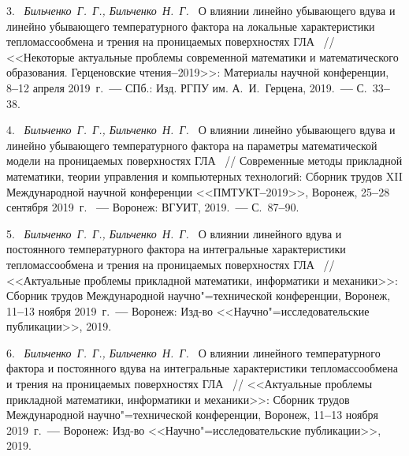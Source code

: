 3.~%
\textit%
{Бильченко~Г.~Г.,
 Бильченко~Н.~Г.~}
{%
  {О  влиянии
линейно  убывающего
вдува  и
линейно  убывающего
температурного  фактора
на  локальные  характеристики
тепломассообмена  и 	трения
на  проницаемых  поверхностях  ГЛА}%
~/$\!$/
  <<Некоторые  актуальные  проблемы
  современной  математики
  и  математического  образования.
    Герценовские  чтения{\textbf{--}}2019>>:
  Материалы  научной  конференции,
  8{\textbf{--}}12
  апреля  2019~г.~{\textbf{---}}
  СПб.:  Изд.  \mbox{РГПУ}  им.  А.~И.~Герцена,
  2019.~{\textbf{---}}
  С.~33{\textbf{--}}38.%
  }



4.~%
\textit%
{Бильченко~Г.~Г.,
 Бильченко~Н.~Г.~}
{%
  {О  влиянии
линейно  убывающего
вдува  и
линейно  убывающего
температурного  фактора
на  параметры  математической  модели
на  проницаемых  поверхностях  ГЛА}%
~/$\!$/
  Современные  методы  прикладной  математики,
  теории  управления  и  компьютерных  технологий:
  Сборник  трудов
  XII  Международной  научной
  конференции
  <<\mbox{ПМТУКТ}{\textbf{--}}2019>>,
  Воронеж,
  25{\textbf{--}}28
  сентября  2019~г.%
~{\textbf{---}}
  Воронеж:  ВГУИТ,
  2019.~{\textbf{---}}
  С.~87{\textbf{--}}90.%
  }



5.~%
\textit%
{Бильченко~Г.~Г.,
 Бильченко~Н.~Г.~}
{%
  {О  влиянии  линейного  вдува
и  постоянного  температурного  фактора
на  интегральные  характеристики  тепломассообмена
и  трения
на  проницаемых  поверхностях
ГЛА}%
~/$\!$/
  <<Актуальные  проблемы
   прикладной  математики,  информатики
   и  механики>>:
  Сборник  трудов  Международной
  научно"=технической  конференции,
  Воронеж,
  11{\textbf{--}}13
  ноября  2019~г.~{\textbf{---}}
  Воронеж:
  Изд-во  <<Научно"=исследовательские  публикации>>,
  2019.%
  }



6.~%
\textit%
{Бильченко~Г.~Г.,
 Бильченко~Н.~Г.~}
{%
  {О  влиянии  линейного  температурного  фактора
и  постоянного  вдува
на  интегральные  характеристики  тепломассообмена
и  трения
на  проницаемых  поверхностях
ГЛА}%
~/$\!$/
  <<Актуальные  проблемы
   прикладной  математики,  информатики
   и  механики>>:
  Сборник  трудов  Международной
  научно"=технической  конференции,
  Воронеж,
  11{\textbf{--}}13
  ноября  2019~г.~{\textbf{---}}
  Воронеж:
  Изд-во  <<Научно"=исследовательские  публикации>>,
  2019.%
  }



